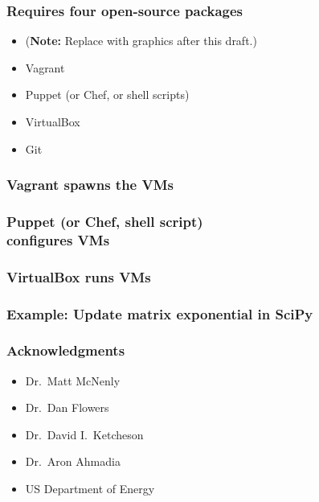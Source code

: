 \documentclass [14pt]{beamer}
\begin{document}
\begin{frame}
\frametitle{Requires four open-source packages}
\begin{itemize}
\item (\textbf{Note:} Replace with graphics after this draft.)
\item Vagrant
\item Puppet (or Chef, or shell scripts)
\item VirtualBox
\item Git
\end{itemize}
\end{frame}

\begin{frame}
\frametitle{Vagrant spawns the VMs}
\end{frame}

\begin{frame}
\frametitle{Puppet (or Chef, shell script)\\
configures VMs}
\end{frame}

\begin{frame}
\frametitle{VirtualBox runs VMs}
\end{frame}

\begin{frame}
\frametitle{Example: Update matrix exponential in SciPy}
\end{frame}

\begin{frame}
\frametitle{Acknowledgments}
\begin{itemize}
\item Dr.\ Matt McNenly
\item Dr.\ Dan Flowers
\item Dr.\ David I.\ Ketcheson
\item Dr.\ Aron Ahmadia
\item US Department of Energy
\end{itemize}
\end{frame}

\begin{frame}
\end{frame}
\end{document}
